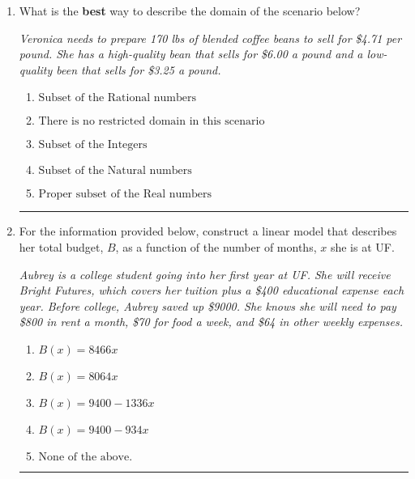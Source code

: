 \documentclass[14pt]{extbook}
\newcommand{\litem}[1]{\item#1\hspace*{-1cm}\rule{\textwidth}{0.4pt}}
\begin{document}
\begin{enumerate}
{\begin{enumerate}[label=\Alph*.]
\end{enumerate} }
\litem{
What is the \textbf{best} way to describe the domain of the scenario below?
\begin{center}
    \textit{ Veronica needs to prepare 170 lbs of blended coffee beans to sell for \$4.71 per pound. She has a high-quality bean that sells for \$6.00 a pound and a low-quality been that sells for \$3.25 a pound. }
\end{center}
\begin{enumerate}[label=\Alph*.]
\item \( \text{Subset of the Rational numbers} \)
\item \( \text{There is no restricted domain in this scenario} \)
\item \( \text{Subset of the Integers} \)
\item \( \text{Subset of the Natural numbers} \)
\item \( \text{Proper subset of the Real numbers} \)

\end{enumerate} }
\litem{
For the information provided below, construct a linear model that describes her total budget, $B$, as a function of the number of months, $x$ she is at UF.
\begin{center}
    \textit{ Aubrey is a college student going into her first year at UF. She will receive Bright Futures, which covers her tuition plus a \$400 educational expense each year. Before college, Aubrey saved up \$9000. She knows she will need to pay \$800 in rent a month, \$70 for food a week, and \$64 in other weekly expenses. }
\end{center}
\begin{enumerate}[label=\Alph*.]
\item \( B(x) = 8466 x \)
\item \( B(x) = 8064 x \)
\item \( B(x) = 9400 - 1336 x \)
\item \( B(x) = 9400 - 934 x \)
\item \( \text{None of the above.} \)


\end{enumerate}}
\end{enumerate}
\end{document}
